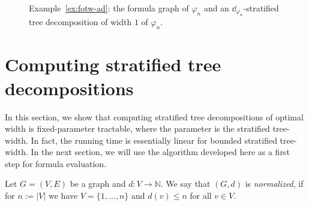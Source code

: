\documentclass{LMCS}
\renewcommand{\phi}{\varphi}
\begin{document}
\def\vertexnodes{\tikzstyle{every node}=[fill=black,circle,scale=0.5]}
\def\linecloud#1{
\draw[color=black,cap=round,line width=3.1mm] #1;
\draw[color=white,cap=round,line width=2.8mm] #1;
\draw[color=white,style=nearly transparent,cap=round,line width=2.8mm] #1;
}
\begin{figure}
$\quad$$\quad$$\quad$$\quad$
\caption{Example~\ref{ex:fotw-ad}: the formula graph of $\phi_n$ and
an $\dd_{\phi_n}$-stratified tree decomposition of width $1$ of $\phi_n$.}
\label{fig:fotw-ad}
\end{figure}

\section{Computing stratified tree decompositions}\label{sec:computing}

In this section, 
we show that computing stratified tree decompositions of optimal width 
is fixed-parameter tractable, 
where the parameter is the stratified tree-width. 
In fact, the running time is essentially linear 
for bounded stratified tree-width. 
In the next section, we will use the algorithm developed here 
as a first step for formula evaluation. 

\begin{defi}
Let $G=(V,E)$ be a graph and $d:V\to\mathbb N$. 
We say that $(G,d)$ is \emph{normalized}, 
if for $n:=\left|V\right|$ 
we have $V=\{1,\ldots,n\}$ and $d(v)\leq n$ for all $v\in V$. 
\end{defi}
\end{document}
